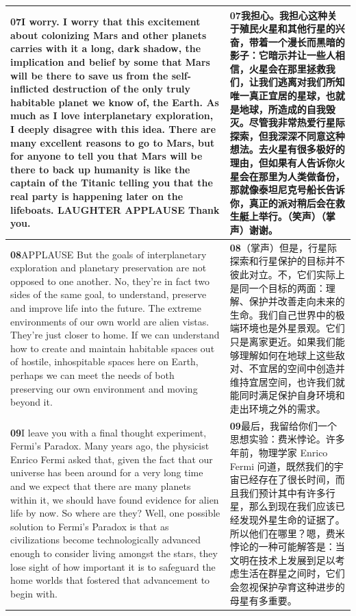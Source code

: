 \documentclass[UTF8,zihao=-4,fontset=fandol]{ctexart}
\newcommand{\TranscriptColumn}{\raggedright\arraybackslash\hyphenpenalty=10000\exhyphenpenalty=10000\sloppy}
\begin{document}
\begin{longtable}{>{\TranscriptColumn}p{} >{\TranscriptColumn}p{}}
\textbf{07}\quad I worry. I worry that this excitement about colonizing Mars and other planets carries with it a long, dark shadow, the implication and belief by some that Mars will be there to save us from the self-inflicted destruction of the only truly habitable planet we know of, the Earth. As much as I love interplanetary exploration, I deeply disagree with this idea. There are many excellent reasons to go to Mars, but for anyone to tell you that Mars will be there to back up humanity is like the captain of the Titanic telling you that the real party is happening later on the lifeboats. LAUGHTER APPLAUSE Thank you. & \textbf{07}\quad 我担心。我担心这种关于殖民火星和其他行星的兴奋，带着一个漫长而黑暗的影子：它暗示并让一些人相信，火星会在那里拯救我们，让我们逃离对我们所知唯一真正宜居的星球，也就是地球，所造成的自我毁灭。尽管我非常热爱行星际探索，但我深深不同意这种想法。去火星有很多极好的理由，但如果有人告诉你火星会在那里为人类做备份，那就像泰坦尼克号船长告诉你，真正的派对稍后会在救生艇上举行。（笑声）（掌声）谢谢。 \\ \hline
\textbf{08}\quad APPLAUSE But the goals of interplanetary exploration and planetary preservation are not opposed to one another. No, they're in fact two sides of the same goal, to understand, preserve and improve life into the future. The extreme environments of our own world are alien vistas. They're just closer to home. If we can understand how to create and maintain habitable spaces out of hostile, inhospitable spaces here on Earth, perhaps we can meet the needs of both preserving our own environment and moving beyond it. & \textbf{08}\quad （掌声）但是，行星际探索和行星保护的目标并不彼此对立。不，它们实际上是同一个目标的两面：理解、保护并改善走向未来的生命。我们自己世界中的极端环境也是外星景观。它们只是离家更近。如果我们能够理解如何在地球上这些敌对、不宜居的空间中创造并维持宜居空间，也许我们就能同时满足保护自身环境和走出环境之外的需求。 \\ \hline
\textbf{09}\quad I leave you with a final thought experiment, Fermi's Paradox. Many years ago, the physicist Enrico Fermi asked that, given the fact that our universe has been around for a very long time and we expect that there are many planets within it, we should have found evidence for alien life by now. So where are they? Well, one possible solution to Fermi's Paradox is that as civilizations become technologically advanced enough to consider living amongst the stars, they lose sight of how important it is to safeguard the home worlds that fostered that advancement to begin with. & \textbf{09}\quad 最后，我留给你们一个思想实验：费米悖论。许多年前，物理学家 Enrico Fermi 问道，既然我们的宇宙已经存在了很长时间，而且我们预计其中有许多行星，那么到现在我们应该已经发现外星生命的证据了。所以他们在哪里？嗯，费米悖论的一种可能解答是：当文明在技术上发展到足以考虑生活在群星之间时，它们会忽视保护孕育这种进步的母星有多重要。 \\ \hline

\end{longtable}
\end{document}
